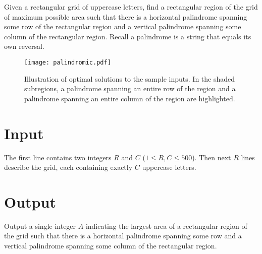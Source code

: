 
Given a rectangular grid of uppercase letters, find a rectangular region of the grid of maximum possible area such that there is a horizontal palindrome spanning some row of the rectangular region and a vertical palindrome spanning some column of the rectangular region.
Recall a palindrome is a string that equals its own reversal.

\begin{figure}[h]
  \begin{center}
  \texttt{[image: palindromic.pdf]}
  \caption{Illustration of optimal solutions to the sample inputs. In the shaded subregions, a palindrome spanning an entire row of the region and a palindrome spanning an entire column of the region are highlighted.}
  \end{center}
\end{figure}

\section*{Input}

The first line contains two integers $R$ and $C$ ($1 \leq R,C \leq 500$). Then next $R$ lines describe the grid,
each containing exactly $C$ uppercase letters.

\section*{Output}
Output a single integer $A$ indicating the largest area of a rectangular region of the grid 
such that there is a horizontal palindrome spanning some row and a vertical palindrome spanning some column of the rectangular region.
